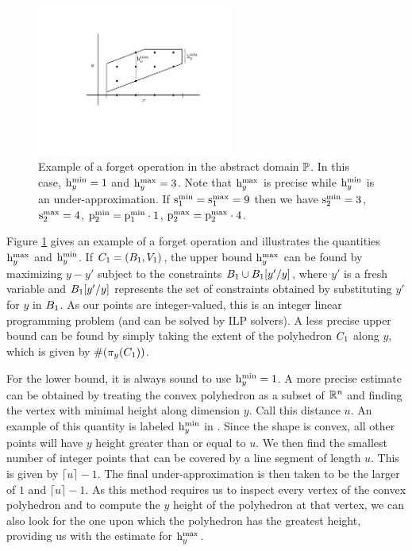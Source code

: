 \begin{figure}
\begin{center}
\includegraphics[width=6.5cm]{figures/forget.pdf} %
\end{center}
\caption{\label{fig:forget} Example of a forget operation in the abstract domain $\mathbb{P}$.  In this case, $\mathrm{h}^\mathrm{min}_{y} = 1$ and $\mathrm{h}^\mathrm{max}_{y} = 3$.  Note that $\mathrm{h}^\mathrm{max}_{y}$ is precise while $\mathrm{h}^\mathrm{min}_{y}$ is an under-approximation.  If $\mathrm{s}^\mathrm{min}_{1} = \mathrm{s}^\mathrm{max}_{1} = 9$ then we have $\mathrm{s}^\mathrm{min}_{2} = 3$, $\mathrm{s}^\mathrm{max}_{2} = 4$, $\mathrm{p}^\mathrm{min}_{2} = \mathrm{p}^\mathrm{min}_{1} \cdot 1$, $\mathrm{p}^\mathrm{max}_{2} = \mathrm{p}^\mathrm{max}_{2} \cdot 4$.}
\end{figure}

Figure \ref{fig:forget} gives an example of a forget operation and
illustrates the quantities $\mathrm{h}^\mathrm{max}_{y}$ and $\mathrm{h}^\mathrm{min}_{y}$.  If $ C_1 =
(B_1, V_1) $, the upper bound $\mathrm{h}^\mathrm{max}_{y}$ can be found by maximizing $y - y'$ subject to the
constraints $B_1 \cup B_1[y' / y]$, where $y'$ is a fresh variable and $B_1[y'/y]$ represents the set of
constraints obtained by substituting $y'$ for $y$ in $B_1$.  As our
points are integer-valued, this is an integer linear programming
problem (and can be solved by ILP solvers). A less precise upper bound
can be found by simply taking the extent of the polyhedron $C_{1}$ along $y$,
which is given by $\#(\pi_y(C_{1}))$.

For the lower bound, it is always sound to use $\mathrm{h}^\mathrm{min}_{y} = 1$. A more
precise estimate can be obtained by treating the convex polyhedron as
a subset of $ \mathbb{R}^n $ and finding the vertex with minimal height
along dimension $y$. Call this distance $u$. An example of this
quantity is labeled $ \mathrm{h}^\mathrm{min}_{y} $ in . Since the shape
is convex, all other points will have $y$ height greater than or equal
to $u$. We then find the smallest number of integer points that can be
covered by a line segment of length $u$. This is given by $\lceil u
\rceil - 1$.  The final under-approximation is then taken to be the
larger of $ 1 $ and $ \lceil u \rceil -1 $. As this method requires us
to inspect every vertex of the convex polyhedron and to compute the
$y$ height of the polyhedron at that vertex, we can also look for the
one upon which the polyhedron has the greatest height, providing us
with the estimate for $ \mathrm{h}^\mathrm{max}_{y} $.

